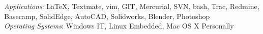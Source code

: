 \documentclass[10pt]{article}
\newenvironment{innerlist}[1][\enskip\textbullet]%
        {\begin{compactitem}[#1]}{\end{compactitem}}
\newcommand{\blankline}{\quad\pagebreak[2]}
\begin{document}
\textit{Applications}: \LaTeX{}, Textmate, vim, GIT, Mercurial, SVN, bash, Trac, Redmine, Basecamp, SolidEdge, AutoCAD, Solidworks, Blender, Photoshop \\


\textit{Operating Systems}: Windows IT, Linux Embedded, Mac OS X Personally
\end{document}
